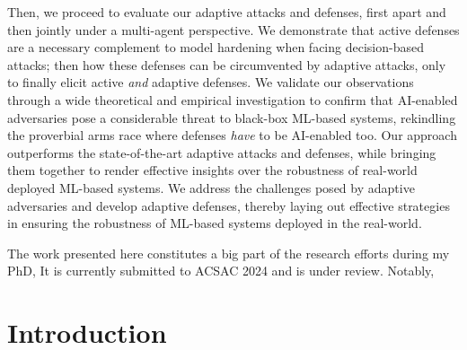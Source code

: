 Then, we proceed to evaluate our adaptive attacks and defenses, first apart and then jointly under a multi-agent perspective.
We demonstrate that active defenses are a necessary complement to model hardening when facing decision-based attacks; then how these defenses can be circumvented by adaptive attacks, only to finally elicit active \emph{and} adaptive defenses.
We validate our observations through a wide theoretical and empirical investigation to confirm that AI-enabled adversaries pose a considerable threat to black-box ML-based systems, rekindling the proverbial arms race where defenses \emph{have} to be AI-enabled too.
Our approach outperforms the state-of-the-art adaptive attacks and defenses, while bringing them together to render effective insights over the robustness of real-world deployed ML-based systems.
We address the challenges posed by adaptive adversaries and develop adaptive defenses, thereby laying out effective strategies in ensuring the robustness of ML-based systems deployed in the real-world.

The work presented here constitutes a big part of the research efforts during my PhD, 
It is currently submitted to ACSAC 2024 and is under review.
Notably, 

\section{Introduction}



